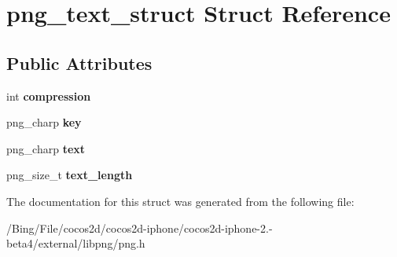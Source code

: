 \hypertarget{structpng__text__struct}{\section{png\-\_\-text\-\_\-struct Struct Reference}
\label{structpng__text__struct}
}
\subsection*{Public Attributes}
\begin{DoxyCompactItemize}
\item 
\hypertarget{structpng__text__struct_ad09c73bc91f014ad352abfbb3b61b8d1}{int {\bfseries compression}}\label{structpng__text__struct_ad09c73bc91f014ad352abfbb3b61b8d1}

\item 
\hypertarget{structpng__text__struct_a99c3063a15889d2fc242f24b69c567ef}{png\-\_\-charp {\bfseries key}}\label{structpng__text__struct_a99c3063a15889d2fc242f24b69c567ef}

\item 
\hypertarget{structpng__text__struct_a27492227bc525bee14abcc8002084edd}{png\-\_\-charp {\bfseries text}}\label{structpng__text__struct_a27492227bc525bee14abcc8002084edd}

\item 
\hypertarget{structpng__text__struct_a26312284ecc7a95e2168a29d0170b411}{png\-\_\-size\-\_\-t {\bfseries text\-\_\-length}}\label{structpng__text__struct_a26312284ecc7a95e2168a29d0170b411}

\end{DoxyCompactItemize}


The documentation for this struct was generated from the following file\-:\begin{DoxyCompactItemize}
\item 
/\-Bing/\-File/cocos2d/cocos2d-\/iphone/cocos2d-\/iphone-\/2.-\/beta4/external/libpng/png.\-h\end{DoxyCompactItemize}
